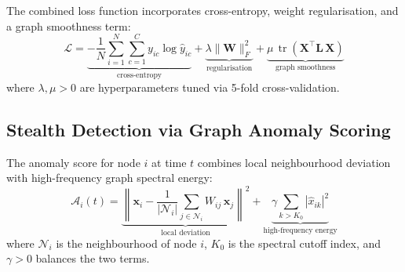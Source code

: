 \documentclass[sensors,article,submit,pdftex]{mdpi}
\newcommand{\vect}[1]{\boldsymbol{#1}}
\newcommand{\mat}[1]{\mathbf{#1}}
\DeclareMathOperator{\tr}{tr}
\begin{document}
The combined loss function incorporates cross-entropy, weight regularisation, and a graph smoothness term:
\begin{equation}
    \mathcal{L} = \underbrace{-\frac{1}{N} \sum_{i=1}^{N} \sum_{c=1}^{C} y_{ic} \log \hat{y}_{ic}}_{\text{cross-entropy}} + \underbrace{\lambda \|\mat{W}\|_F^2}_{\text{regularisation}} + \underbrace{\mu\, \tr(\mat{X}^\top \mat{L}\, \mat{X})}_{\text{graph smoothness}}
    \label{eq:loss}
\end{equation}
where $\lambda, \mu > 0$ are hyperparameters tuned via 5-fold cross-validation.

\subsection{Stealth Detection via Graph Anomaly Scoring}
The anomaly score for node $i$ at time $t$ combines local neighbourhood deviation with high-frequency graph spectral energy:
\begin{equation}
    \mathcal{A}_i(t) = \underbrace{\left\| \vect{x}_i - \frac{1}{|\mathcal{N}_i|} \sum_{j \in \mathcal{N}_i} W_{ij}\, \vect{x}_j \right\|^2}_{\text{local deviation}} + \underbrace{\gamma \sum_{k > K_0} |\hat{x}_{ik}|^2}_{\text{high-frequency energy}}
    \label{eq:anomaly}
\end{equation}
where $\mathcal{N}_i$ is the neighbourhood of node $i$, $K_0$ is the spectral cutoff index, and $\gamma > 0$ balances the two terms.
\end{document}
